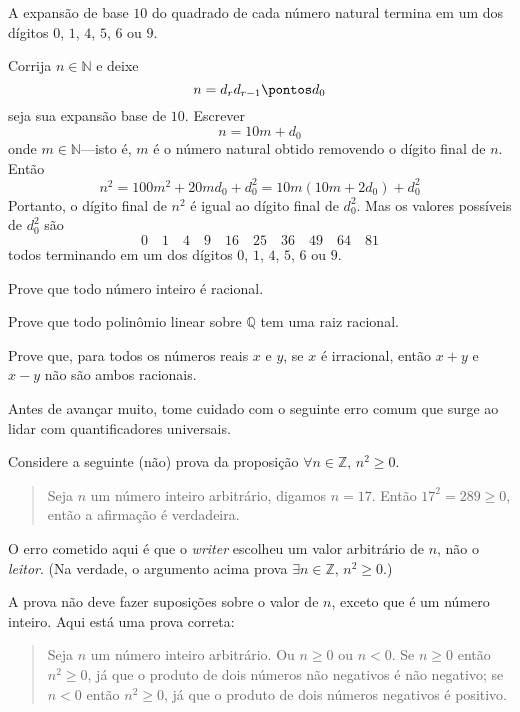 \begin{proposition}
A expansão de base $10$ do quadrado de cada número natural termina em um dos dígitos $0$, $1$, $4$, $5$, $6$ ou $9$.
\end{proposition}

\begin{cproof}
Corrija $n \in \mathbb{N}$ e deixe
\[n=d_rd_{r-1} \pontos d_0\]
seja sua expansão base de $ 10$. Escrever
\[n=10m+d_0\]
onde $m \in \mathbb{N}$---isto é, $m$ é o número natural obtido removendo o dígito final de $n$. Então
\[n^2=100m^2+20md_0+d_0^2 = 10m(10m+2d_0)+d_0^2\]
Portanto, o dígito final de $n^2$ é igual ao dígito final de $d_0^2$. Mas os valores possíveis de $d_0^2$ são
\[0 \quad 1 \quad 4 \quad 9 \quad 16 \quad 25 \quad 36 \quad 49 \quad 64 \quad 81\]
todos terminando em um dos dígitos $0$, $1$, $4$, $5$, $6$ ou $9$.
\end{cproof}

\begin{exercise}
\label{exEveryIntegerIsRational}
Prove que todo número inteiro é racional.
\end{exercise}

\begin{exercise}
Prove que todo polinômio linear sobre $\mathbb{Q}$ tem uma raiz racional.
\end{exercise}

\begin{exercise}
Prove que, para todos os números reais $x$ e $y$, se $x$ é irracional, então $x+y$ e $x-y$ não são ambos racionais.
\end{exercise}

Antes de avançar muito, tome cuidado com o seguinte erro comum que surge ao lidar com quantificadores universais.

\begin{commonerror}
Considere a seguinte (não) prova da proposição $\forall n \in \mathbb{Z},\, n^2 \ge 0$.

\begin{quote}
Seja $n$ um número inteiro arbitrário, digamos $n=17$. Então $17^2 = 289 \ge 0$, então a afirmação é verdadeira.

\end{quote}

O erro cometido aqui é que o \textit{writer} escolheu um valor arbitrário de $n$, não o \textit{leitor}. (Na verdade, o argumento acima prova $\exists n \in \mathbb{Z},\, n^2 \ge 0$.)

A prova não deve fazer suposições sobre o valor de $n$, exceto que é um número inteiro. Aqui está uma prova correta:

\begin{quote}
Seja $n$ um número inteiro arbitrário. Ou $n \ge 0$ ou $n < 0$. Se $n \ge 0$ então $n^2 \ge 0$, já que o produto de dois números não negativos é não negativo; se $n<0$ então $n^2 \ge 0$, já que o produto de dois números negativos é positivo.
\end{quote}
\end{commonerror}

